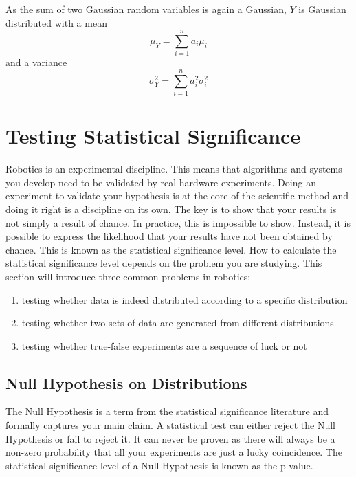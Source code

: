 As the sum of two Gaussian random variables is again a Gaussian, $Y$ is Gaussian distributed with a mean \begin{equation}
\mu_Y=\sum_{i=1}^na_i\mu_i
\end{equation}
and a variance
\begin{equation}
\sigma_Y^2=\sum_{i=1}^na_i^2\sigma_i^2
\end{equation}  



\section{Testing Statistical Significance}\label{sec:stattest}
Robotics is an experimental discipline. This means that algorithms and systems you develop need to be validated by real hardware experiments. Doing an experiment to validate your hypothesis is at the core of the scientific method and doing it right is a discipline on its own. The key is to show that your results is not simply a result of chance. In practice, this is impossible to show. Instead, it is possible to express the likelihood that your results have not been obtained by chance. This is known as the statistical significance level. How to calculate the statistical significance level depends on the problem you are studying. This section will introduce three common problems in robotics:

\begin{enumerate}
\item testing whether data is indeed distributed according to a specific distribution
\item testing whether two sets of data are generated from different distributions
\item testing whether true-false experiments are a sequence of luck or not
\end{enumerate}

\subsection{Null Hypothesis on Distributions}
The Null Hypothesis is a term from the statistical significance literature and formally captures your main claim. A statistical test can either reject the Null Hypothesis or fail to reject it. It can never be proven as there will always be a non-zero probability that all your experiments are just a lucky coincidence. The statistical significance level of a Null Hypothesis is known as the p-value.

